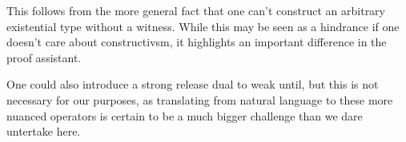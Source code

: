 \documentclass[a4paper, 11pt]{article}
\begin{document}
\begin{code}%
%
\>[2]\AgdaSpace{}%
\AgdaSymbol{:}\AgdaSpace{}%
\AgdaSymbol{\{}\AgdaSymbol{\}}\AgdaSpace{}%
\AgdaSpace{}%
\AgdaSpace{}%
\AgdaSpace{}%
\AgdaSpace{}%
\AgdaSpace{}%
\<%
\\
%
\>[2]\AgdaSpace{}%
\AgdaSymbol{\{}\AgdaSymbol{\}}\AgdaSpace{}%
\AgdaSpace{}%
\AgdaSpace{}%
\AgdaSymbol{=}\AgdaSpace{}%
\AgdaSpace{}%
\AgdaSpace{}%
\AgdaSpace{}%
\AgdaSpace{}%
\AgdaSpace{}%
\AgdaSpace{}%
\<%
\\
%
\\[\AgdaEmptyExtraSkip]%
%
\>[2]\<%
\\
%
\>[2]\<%
\\
\>[2][@{}l@{\AgdaIndent{0}}]%
\>[4]\AgdaSpace{}%
\AgdaSymbol{:}\AgdaSpace{}%
\AgdaSymbol{\{}\AgdaSpace{}%
\AgdaSymbol{:}\AgdaSpace{}%
\AgdaSymbol{\}}\AgdaSpace{}%
\AgdaSymbol{\{}\AgdaSpace{}%
\AgdaSymbol{:}\AgdaSpace{}%
\AgdaSymbol{\}}\AgdaSpace{}%
\AgdaSpace{}%
\AgdaSpace{}%
\AgdaSymbol{\{}\AgdaSymbol{\}}\AgdaSpace{}%
\AgdaSymbol{(}\AgdaSpace{}%
\AgdaSymbol{(}\AgdaSpace{}%
\AgdaSymbol{))}\AgdaSpace{}%
\AgdaSymbol{(}\AgdaSpace{}%
\AgdaSymbol{(}\AgdaSpace{}%
\AgdaSymbol{))}\<%
\end{code}

This follows from the more general fact that one can't construct an arbitrary
existential type without a witness. While this may be seen as a hindrance if one
doesn't care about constructivsm, it highlights an important difference in the
proof assistant.

One could also introduce a strong release dual to weak until, but this is not
necessary for our purposes, as translating from natural language to these more
nuanced operators is certain to be a much bigger challenge than we dare
untertake here.
\end{document}
